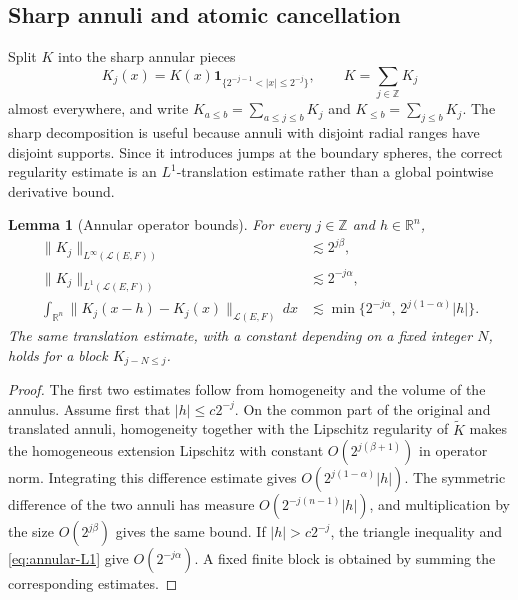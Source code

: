 \documentclass[10pt,a4paper]{amsart}
\numberwithin{equation}{section}
\newtheorem{lemma}[theorem]{Lemma}
\newcommand{\R}{\mathbb R}
\newcommand{\cL}{\mathcal L}
\newcommand{\norm}[1]{\lVert #1\rVert}
\begin{document}
\subsection{Sharp annuli and atomic cancellation}
Split $K$ into the sharp annular pieces
\begin{equation}\label{eq:annular-kernel}
 K_j(x)=K(x)\mathbf 1_{\{2^{-j-1}<|x|\le2^{-j}\}},
 \qquad K=\sum_{j\in\mathbb Z}K_j
\end{equation}
almost everywhere, and write $K_{a\le b}=\sum_{a\le j\le b}K_j$ and
$K_{\le b}=\sum_{j\le b}K_j$.  The sharp decomposition is useful because
annuli with disjoint radial ranges have disjoint supports.  Since it introduces
jumps at the boundary spheres, the correct regularity estimate is an
$L^1$-translation estimate rather than a global pointwise derivative bound.

\begin{lemma}[Annular operator bounds]\label{lem:annular-translation}
For every $j\in\mathbb Z$ and $h\in\R^n$,
\begin{align}
 \norm{K_j}_{L^\infty(\cL(E,F))}&\lesssim2^{j\beta},               \label{eq:annular-Linfty}\\
 \norm{K_j}_{L^1(\cL(E,F))}&\lesssim2^{-j\alpha},                 \label{eq:annular-L1}\\
 \int_{\R^n}\norm{K_j(x-h)-K_j(x)}_{\cL(E,F)}\,dx
 &\lesssim \min\{2^{-j\alpha},\,2^{j(1-\alpha)}|h|\}.           \label{eq:annular-translation}
\end{align}
The same translation estimate, with a constant depending on a fixed integer
$N$, holds for a block $K_{j-N\le j}$.
\end{lemma}

\begin{proof}
The first two estimates follow from homogeneity and the volume of the annulus.
Assume first that $|h|\le c2^{-j}$.  On the common part of the original and
translated annuli, homogeneity together with the Lipschitz regularity of
$\widetilde K$ makes the homogeneous extension Lipschitz with constant
$O(2^{j(\beta+1)})$ in operator norm.  Integrating this difference estimate
gives $O(2^{j(1-\alpha)}|h|)$.  The symmetric difference of the two annuli has
measure $O(2^{-j(n-1)}|h|)$, and multiplication by the size
$O(2^{j\beta})$ gives the same bound.  If $|h|>c2^{-j}$, the triangle
inequality and \eqref{eq:annular-L1} give $O(2^{-j\alpha})$.  A fixed finite
block is obtained by summing the corresponding estimates.
\end{proof}
\end{document}
